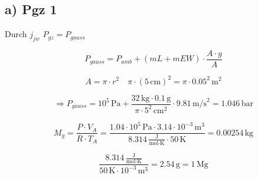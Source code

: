 \subsection*{a) Pgz 1}

Durch $j_{jw}$ \quad $P_{gz} = P_{gauss}$

\[
P_{gauss} = P_{amb} + (mL + mEW) \cdot \frac{A \cdot g}{A}
\]

\[
A = \pi \cdot r^2 \quad \pi \cdot (5 \, \text{cm})^2 = \pi \cdot 0.05^2 \, \text{m}^2
\]

\[
\Rightarrow P_{gauss} = 10^5 \, \text{Pa} + \frac{32 \, \text{kg} \cdot 0.1 \, \text{g}}{\pi \cdot 5^2 \, \text{cm}^2} \cdot 9.81 \, \text{m/s}^2 = 1.046 \, \text{bar}
\]

\[
M_g = \frac{P \cdot V_A}{R \cdot T_A} = \frac{1.04 \cdot 10^5 \, \text{Pa} \cdot 3.14 \cdot 10^{-3} \, \text{m}^3}{8.314 \, \frac{\text{J}}{\text{mol} \cdot \text{K}} \cdot 50 \, \text{K}} = 0.00254 \, \text{kg}
\]

\[
\frac{8.314 \, \frac{\text{J}}{\text{mol} \cdot \text{K}}}{50 \, \text{K} \cdot 10^{-3} \, \text{m}^3} = 2.54 \, \text{g} = 1 \, \text{Mg}
\]